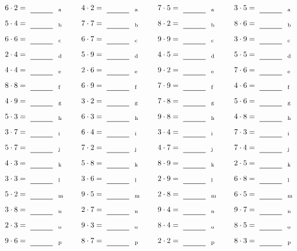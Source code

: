 \documentclass
[
  draft    = true,
  fontsize = 11pt,
  parskip  = half-
]
{scrartcl}
\begin{document}
\par\vfill\par
\begin{align*}
    \pline{6\cdot2}&=\rline{a}
  & \pline{4\cdot2}&=\rline{a}
  & \pline{7\cdot5}&=\rline{a}
  & \pline{3\cdot5}&=\rline{a} \\[1ex]
    \pline{5\cdot4}&=\rline{b}
  & \pline{7\cdot7}&=\rline{b}
  & \pline{8\cdot2}&=\rline{b}
  & \pline{8\cdot6}&=\rline{b} \\[1ex]
    \pline{6\cdot6}&=\rline{c}
  & \pline{6\cdot7}&=\rline{c}
  & \pline{9\cdot9}&=\rline{c}
  & \pline{3\cdot9}&=\rline{c} \\[1ex]
    \pline{2\cdot4}&=\rline{d}
  & \pline{5\cdot9}&=\rline{d}
  & \pline{4\cdot5}&=\rline{d}
  & \pline{5\cdot5}&=\rline{d} \\[1ex]
    \pline{4\cdot4}&=\rline{e}
  & \pline{2\cdot6}&=\rline{e}
  & \pline{9\cdot2}&=\rline{e}
  & \pline{7\cdot6}&=\rline{e} \\[1ex]
    \pline{8\cdot8}&=\rline{f}
  & \pline{6\cdot9}&=\rline{f}
  & \pline{7\cdot9}&=\rline{f}
  & \pline{4\cdot6}&=\rline{f} \\[1ex]
    \pline{4\cdot9}&=\rline{g}
  & \pline{3\cdot2}&=\rline{g}
  & \pline{7\cdot8}&=\rline{g}
  & \pline{5\cdot6}&=\rline{g} \\[1ex]
    \pline{5\cdot3}&=\rline{h}
  & \pline{6\cdot3}&=\rline{h}
  & \pline{9\cdot8}&=\rline{h}
  & \pline{4\cdot8}&=\rline{h} \\[1ex]
    \pline{3\cdot7}&=\rline{i}
  & \pline{6\cdot4}&=\rline{i}
  & \pline{3\cdot4}&=\rline{i}
  & \pline{7\cdot3}&=\rline{i} \\[1ex]
    \pline{5\cdot7}&=\rline{j}
  & \pline{7\cdot2}&=\rline{j}
  & \pline{4\cdot7}&=\rline{j}
  & \pline{7\cdot4}&=\rline{j} \\[1ex]
    \pline{4\cdot3}&=\rline{k}
  & \pline{5\cdot8}&=\rline{k}
  & \pline{8\cdot9}&=\rline{k}
  & \pline{2\cdot5}&=\rline{k} \\[1ex]
    \pline{3\cdot3}&=\rline{l}
  & \pline{3\cdot6}&=\rline{l}
  & \pline{2\cdot9}&=\rline{l}
  & \pline{6\cdot8}&=\rline{l} \\[1ex]
    \pline{5\cdot2}&=\rline{m}
  & \pline{9\cdot5}&=\rline{m}
  & \pline{2\cdot8}&=\rline{m}
  & \pline{6\cdot5}&=\rline{m} \\[1ex]
    \pline{3\cdot8}&=\rline{n}
  & \pline{2\cdot7}&=\rline{n}
  & \pline{9\cdot4}&=\rline{n}
  & \pline{9\cdot7}&=\rline{n} \\[1ex]
    \pline{2\cdot3}&=\rline{o}
  & \pline{9\cdot3}&=\rline{o}
  & \pline{8\cdot4}&=\rline{o}
  & \pline{8\cdot5}&=\rline{o} \\[1ex]
    \pline{9\cdot6}&=\rline{p}
  & \pline{8\cdot7}&=\rline{p}
  & \pline{2\cdot2}&=\rline{p}
  & \pline{8\cdot3}&=\rline{p}
\end{align*}
\end{document}
